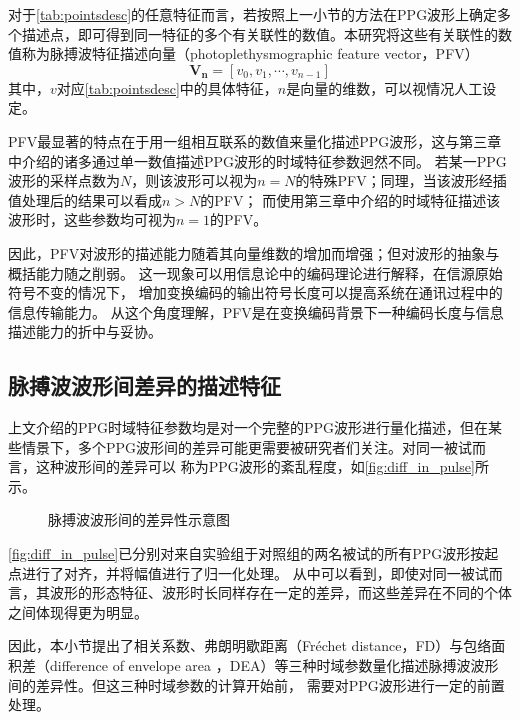 对于\autoref{tab:pointsdesc}的任意特征而言，若按照上一小节的方法在PPG波形上确定多个描述点，即可得到同一特征的多个有关联性的数值。本研究将这些有关联性的数值称为脉搏波特征描述向量（photoplethysmographic feature vector，PFV）
\begin{equation}
    \label{equ:featurevector}
    \boldsymbol {V_n}=[v_0,v_1,\cdots,v_{n-1}]
\end{equation}
其中，$v$对应\autoref{tab:pointsdesc}中的具体特征，$n$是向量的维数，可以视情况人工设定。

PFV最显著的特点在于用一组相互联系的数值来量化描述PPG波形，这与第三章中介绍的诸多通过单一数值描述PPG波形的时域特征参数迥然不同。
若某一PPG波形的采样点数为$N$，则该波形可以视为$n=N$的特殊PFV；同理，当该波形经插值处理后的结果可以看成$n>N$的PFV；
而使用第三章中介绍的时域特征描述该波形时，这些参数均可视为$n=1$的PFV。

因此，PFV对波形的描述能力随着其向量维数的增加而增强；但对波形的抽象与概括能力随之削弱。
这一现象可以用信息论中的编码理论进行解释，在信源原始符号不变的情况下，
增加变换编码的输出符号长度可以提高系统在通讯过程中的信息传输能力\cite{Zhao2017}。
从这个角度理解，PFV是在变换编码背景下一种编码长度与信息描述能力的折中与妥协。

\subsection{脉搏波波形间差异的描述特征}
上文介绍的PPG时域特征参数均是对一个完整的PPG波形进行量化描述，但在某些情景下，多个PPG波形间的差异可能更需要被研究者们关注。对同一被试而言，这种波形间的差异可以
称为PPG波形的紊乱程度，如\autoref{fig:diff_in_pulse}所示。

\begin{figure}[htbp]
    \centering
    \quad
    \caption[脉搏波波形间的差异性示意图]{\label{fig:diff_in_pulse}脉搏波波形间的差异性示意图}
\end{figure}

\autoref{fig:diff_in_pulse}已分别对来自实验组于对照组的两名被试的所有PPG波形按起点进行了对齐，并将幅值进行了归一化处理。
从中可以看到，即使对同一被试而言，其波形的形态特征、波形时长同样存在一定的差异，而这些差异在不同的个体之间体现得更为明显。

因此，本小节提出了相关系数、弗朗明歇距离（Fréchet distance，FD）与包络面积差（difference of envelope area ，DEA）等三种时域参数量化描述脉搏波波形间的差异性。但这三种时域参数的计算开始前，
需要对PPG波形进行一定的前置处理。


